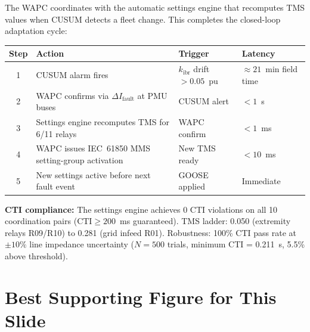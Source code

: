 \documentclass[12pt,a4paper]{article}
\newcommand{\kibr}{k_\mathrm{ibr}}
\begin{document}
The WAPC coordinates with the automatic settings engine that recomputes TMS values when CUSUM detects a fleet change. This completes the closed-loop adaptation cycle:

\begin{center}
\begin{tabular}{@{}clll@{}}
\toprule
\textbf{Step} & \textbf{Action} & \textbf{Trigger} & \textbf{Latency} \\
\midrule
1 & CUSUM alarm fires & $\kibr$ drift $> 0.05$~pu & $\approx 21$~min field time \\
2 & WAPC confirms via $\Delta I_\mathrm{fault}$ at PMU buses & CUSUM alert & $< 1$~s \\
3 & Settings engine recomputes TMS for 6/11 relays & WAPC confirm & $< 1$~ms \\
4 & WAPC issues IEC~61850 MMS setting-group activation & New TMS ready & $< 10$~ms \\
5 & New settings active before next fault event & GOOSE applied & Immediate \\
\bottomrule
\end{tabular}
\end{center}

\textbf{CTI compliance:} The settings engine achieves 0 CTI violations on all 10 coordination pairs ($\mathrm{CTI} \geq 200$~ms guaranteed). TMS ladder: 0.050 (extremity relays R09/R10) to 0.281 (grid infeed R01). Robustness: 100\% CTI pass rate at $\pm 10\%$ line impedance uncertainty ($N = 500$ trials, minimum CTI = 0.211~s, 5.5\% above threshold).

\section{Best Supporting Figure for This Slide}
\end{document}
